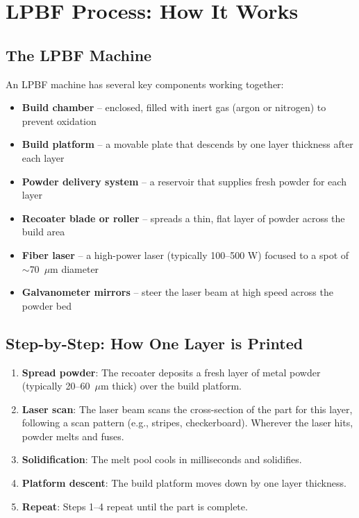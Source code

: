 \documentclass[12pt,a4paper]{report}
\begin{document}
\chapter{LPBF Process: How It Works}

\section{The LPBF Machine}

An LPBF machine has several key components working together:

\begin{itemize}
  \item \textbf{Build chamber} -- enclosed, filled with inert gas (argon or nitrogen) to prevent oxidation
  \item \textbf{Build platform} -- a movable plate that descends by one layer thickness after each layer
  \item \textbf{Powder delivery system} -- a reservoir that supplies fresh powder for each layer
  \item \textbf{Recoater blade or roller} -- spreads a thin, flat layer of powder across the build area
  \item \textbf{Fiber laser} -- a high-power laser (typically 100--500 W) focused to a spot of $\sim$70~$\mu$m diameter
  \item \textbf{Galvanometer mirrors} -- steer the laser beam at high speed across the powder bed
\end{itemize}

\section{Step-by-Step: How One Layer is Printed}

\begin{enumerate}
  \item \textbf{Spread powder}: The recoater deposits a fresh layer of metal powder (typically 20--60~$\mu$m thick) over the build platform.
  \item \textbf{Laser scan}: The laser beam scans the cross-section of the part for this layer, following a scan pattern (e.g., stripes, checkerboard). Wherever the laser hits, powder melts and fuses.
  \item \textbf{Solidification}: The melt pool cools in milliseconds and solidifies.
  \item \textbf{Platform descent}: The build platform moves down by one layer thickness.
  \item \textbf{Repeat}: Steps 1--4 repeat until the part is complete.
\end{enumerate}
\end{document}
